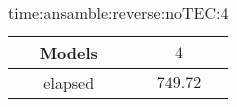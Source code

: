 \begin{table}[!ht]
	\centering
	\begin{tabular}{|c|c|}
		\hline
		Models & $4$ \\ \hline
		elapsed & $749.72$ \\ \hline
	\end{tabular}
	\caption{time:ansamble:reverse:noTEC:4}
	\label{tab:time:ansamble:reverse:noTEC:4}
\end{table}
